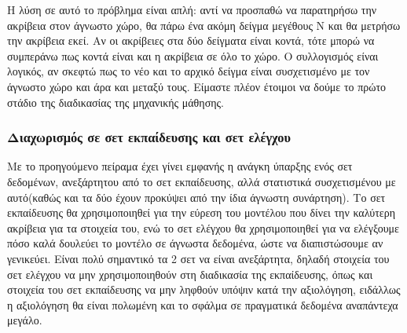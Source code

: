 \documentclass{article}
\begin{document}
Η λύση σε αυτό το πρόβλημα είναι απλή: αντί να προσπαθώ να παρατηρήσω την ακρίβεια στον άγνωστο χώρο, θα πάρω ένα ακόμη δείγμα μεγέθους Ν και θα μετρήσω την ακρίβεια εκεί. Αν οι ακρίβειες στα δύο δείγματα είναι κοντά, τότε μπορώ να συμπεράνω πως κοντά είναι και η ακρίβεια σε όλο το χώρο. Ο συλλογισμός είναι λογικός, αν σκεφτώ πως το νέο και το αρχικό δείγμα είναι συσχετισμένο με τον άγνωστο χώρο και άρα και μεταξύ τους. Είμαστε πλέον έτοιμοι να δούμε το πρώτο στάδιο της διαδικασίας της μηχανικής μάθησης.
\subsubsection{Διαχωρισμός σε σετ εκπαίδευσης και σετ ελέγχου}
Με το προηγούμενο πείραμα έχει γίνει εμφανής η ανάγκη ύπαρξης ενός σετ δεδομένων, ανεξάρτητου από το σετ εκπαίδευσης, αλλά στατιστικά συσχετισμένου με αυτό(καθώς και τα δύο έχουν προκύψει από την ίδια άγνωστη συνάρτηση). Το σετ εκπαίδευσης θα χρησιμοποιηθεί για την εύρεση του μοντέλου που δίνει την καλύτερη ακρίβεια για τα στοιχεία του, ενώ το σετ ελέγχου θα χρησιμοποιηθεί για να ελέγξουμε πόσο καλά δουλεύει το μοντέλο σε άγνωστα δεδομένα, ώστε να διαπιστώσουμε αν γενικεύει. Είναι πολύ σημαντικό τα 2 σετ να είναι ανεξάρτητα, δηλαδή στοιχεία του σετ ελέγχου να μην χρησιμοποιηθούν στη διαδικασία της εκπαίδευσης, όπως και στοιχεία του σετ εκπαίδευσης να μην ληφθούν υπόψιν κατά την αξιολόγηση, ειδάλλως η αξιολόγηση θα είναι πολωμένη και το σφάλμα σε πραγματικά δεδομένα αναπάντεχα μεγάλο.
\end{document}
